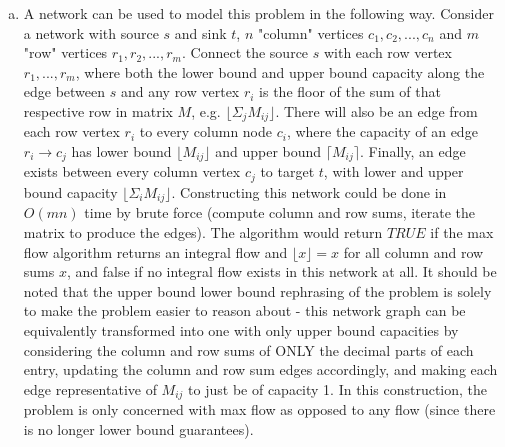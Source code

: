 \documentclass[11pt]{article}
\begin{document}



\begin{enumerate}[(a)]
    \item
    \begin{solution}
    A network can be used to model this problem in the following way. Consider a network with source $s$ and sink $t$, $n$ "column" vertices $c_1,c_2,...,c_n$ and $m$ "row" vertices $r_1,r_2,...,r_m$. Connect the source $s$ with each row vertex $r_1,...,r_m$, where both the lower bound and upper bound capacity along the edge between $s$ and any row vertex $r_i$ is the floor of the sum of that respective row in matrix $M$, e.g. $\lfloor \Sigma_{j} M_{ij} \rfloor$. There will also be an edge from each row vertex $r_i$ to every column node $c_i$, where the capacity of an edge $r_i \to c_j$ has lower bound $\lfloor M_{ij} \rfloor$ and upper bound $\lceil M_{ij} \rceil$. Finally, an edge exists between every column vertex $c_j$ to target $t$, with lower and upper bound capacity $\lfloor \Sigma_{i} M_{ij} \rfloor$. Constructing this network could be done in $O(mn)$ time by brute force (compute column and row sums, iterate the matrix to produce the edges). The algorithm would return $TRUE$ if the max flow algorithm returns an integral flow and $\lfloor x \rfloor = x$ for all column and row sums $x$, and false if no integral flow exists in this network at all. It should be noted that the upper bound lower bound rephrasing of the problem is solely to make the problem easier to reason about - this network graph can be equivalently transformed into one with only upper bound capacities by considering the column and row sums of ONLY the decimal parts of each entry, updating the column and row sum edges accordingly, and making each edge representative of $M_{ij}$ to just be of capacity 1. In this construction, the problem is only concerned with max flow as opposed to any flow (since there is no longer lower bound guarantees). \\ \\

\end{solution}
\end{enumerate}
\end{document}
